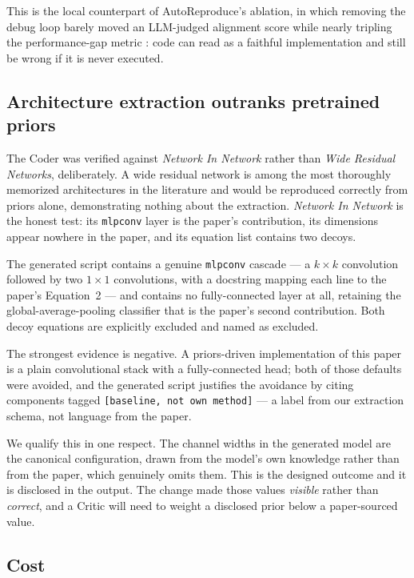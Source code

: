 \documentclass[10pt,twocolumn]{article}
\begin{document}
This is the local counterpart of AutoReproduce's ablation, in which removing the
debug loop barely moved an LLM-judged alignment score while nearly tripling the
performance-gap metric \cite{zhao2025autoreproduce}: code can read as a faithful
implementation and still be wrong if it is never executed.

\subsection{Architecture extraction outranks pretrained priors}

The Coder was verified against \emph{Network In Network} rather than \emph{Wide Residual
Networks}, deliberately. A wide residual network is among the most thoroughly memorized
architectures in the literature and would be reproduced correctly from priors alone,
demonstrating nothing about the extraction. \emph{Network In Network} is the honest test:
its \texttt{mlpconv} layer is the paper's contribution, its dimensions appear nowhere in
the paper, and its equation list contains two decoys.

The generated script contains a genuine \texttt{mlpconv} cascade --- a $k\times k$
convolution followed by two $1\times1$ convolutions, with a docstring mapping each line
to the paper's Equation~2 --- and contains no fully-connected layer at all, retaining the
global-average-pooling classifier that is the paper's second contribution. Both decoy
equations are explicitly excluded and named as excluded.

The strongest evidence is negative. A priors-driven implementation of this paper is a
plain convolutional stack with a fully-connected head; both of those defaults were
avoided, and the generated script justifies the avoidance by citing components tagged
\texttt{[baseline, not own method]} --- a label from our extraction schema, not language
from the paper.

We qualify this in one respect. The channel widths in the generated model are the
canonical configuration, drawn from the model's own knowledge rather than from the paper,
which genuinely omits them. This is the designed outcome and it is disclosed in the
output. The change made those values \emph{visible} rather than \emph{correct}, and a
Critic will need to weight a disclosed prior below a paper-sourced value.


\subsection{Cost}
\end{document}
